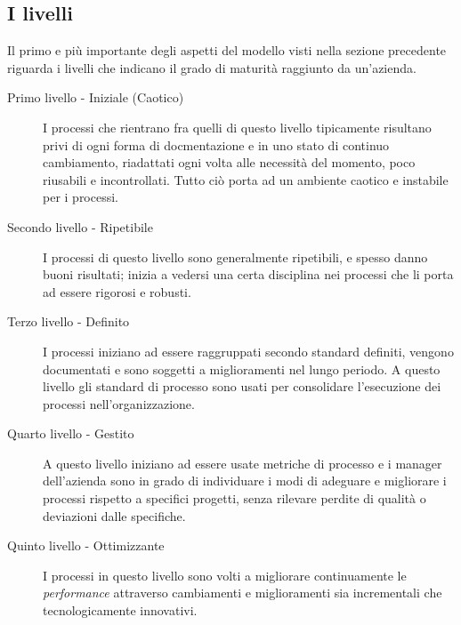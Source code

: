 	\subsection{I livelli}
		Il primo e più importante degli aspetti del modello visti nella sezione precedente riguarda i livelli che indicano il grado di maturità raggiunto da un'azienda.
		\begin{description}
			\item[Primo livello - Iniziale (Caotico)] I processi che rientrano fra quelli di questo livello tipicamente risultano privi di ogni forma di docmentazione e in uno stato di continuo cambiamento, riadattati ogni volta alle necessità del momento, poco riusabili e incontrollati. Tutto ciò porta ad un ambiente caotico e instabile per i processi.
			\item[Secondo livello - Ripetibile] I processi di questo livello sono generalmente ripetibili, e spesso danno buoni risultati; inizia a vedersi una certa disciplina nei processi che li porta ad essere rigorosi e robusti.
			\item[Terzo  livello - Definito] I processi iniziano ad essere raggruppati secondo standard definiti, vengono documentati e sono soggetti a miglioramenti nel lungo periodo. A questo livello gli standard di processo sono usati per consolidare l'esecuzione dei processi nell'organizzazione.
			\item[Quarto livello - Gestito] A questo livello iniziano ad essere usate metriche di processo e i manager dell'azienda sono in grado di individuare i modi di adeguare e migliorare i processi rispetto a specifici progetti, senza rilevare perdite di qualità o deviazioni dalle specifiche.
			\item[Quinto livello - Ottimizzante] I processi in questo livello sono volti a migliorare continuamente le \textit{performance} attraverso cambiamenti e miglioramenti sia incrementali che tecnologicamente innovativi.
		\end{description}


